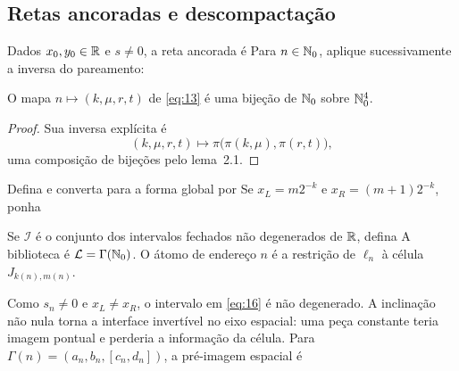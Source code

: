 \subsection{Retas ancoradas e descompactação}
Dados $x_0,y_0\in\mathbb R$ e $s\ne0$, a reta ancorada é
Para $n\in\mathbb N_0$, aplique sucessivamente a inversa do pareamento:
\begin{lema}
O mapa $n\mapsto(k,\mu,r,t)$ de \eqref{eq:13} é uma bijeção de $\mathbb N_0$ sobre $\mathbb N_0^4$.
\end{lema}
\begin{proof}
Sua inversa explícita é
\[
(k,\mu,r,t)\longmapsto\pi\bigl(\pi(k,\mu),\pi(r,t)\bigr),
\]
uma composição de bijeções pelo lema~2.1.
\end{proof}
Defina
e converta para a forma global por
Se $x_L=m2^{-k}$ e $x_R=(m+1)2^{-k}$, ponha
\begin{definicao}
Se $\mathcal I$ é o conjunto dos intervalos fechados não degenerados de $\mathbb R$, defina
A biblioteca é $\mathcal L=\Gamma(\mathbb N_0)$. O átomo de endereço $n$ é a restrição de $\ell_n$ à célula $J_{k(n),m(n)}$.
\end{definicao}
Como $s_n\ne0$ e $x_L\ne x_R$, o intervalo em \eqref{eq:16} é não degenerado. A inclinação não nula torna a interface invertível no eixo espacial: uma peça constante teria imagem pontual e perderia a informação da célula. Para $\Gamma(n)=(a_n,b_n,[c_n,d_n])$, a pré-imagem espacial é

